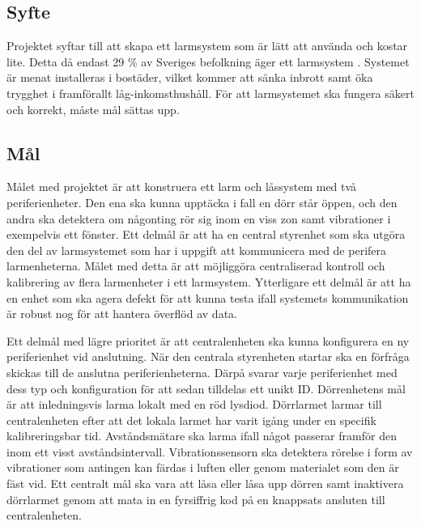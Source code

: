 \documentclass{article}
\begin{document}

\subsection{Syfte}
Projektet syftar till att skapa ett larmsystem som är lätt att använda och kostar lite.
Detta då endast 29 \% av Sveriges befolkning äger ett larmsystem \cite{SSF}.
Systemet är menat installeras i bostäder, vilket kommer att sänka inbrott samt öka trygghet i framförallt låg-inkomsthushåll.
För att larmsystemet ska fungera säkert och korrekt, måste mål sättas upp. 


\subsection{Mål}
Målet med projektet är att konstruera ett larm och låssystem med två periferienheter.
Den ena ska kunna upptäcka i fall en dörr står öppen, och den andra ska detektera om någonting rör sig inom en viss zon samt vibrationer i exempelvis ett fönster. 
Ett delmål är att ha en central styrenhet som ska utgöra den del av larmsystemet som har i uppgift att kommunicera med de perifera larmenheterna.
Målet med detta är att möjliggöra centraliserad kontroll och kalibrering av flera larmenheter i ett larmsystem.
Ytterligare ett delmål är att ha en enhet som ska agera defekt för att kunna testa ifall systemets kommunikation är robust nog för att hantera överflöd av data.

Ett delmål med lägre prioritet är att centralenheten ska kunna konfigurera en ny periferienhet vid anslutning. När den centrala styrenheten startar ska en förfråga skickas till de anslutna periferienheterna. 
Därpå svarar varje periferienhet med dess typ och konfiguration för att sedan tilldelas ett unikt ID. 
Dörrenhetens mål är att inledningsvis larma lokalt med en röd lysdiod. 
Dörrlarmet larmar till centralenheten efter att det lokala larmet har varit igång under en specifik kalibreringsbar tid.
Avståndsmätare ska larma ifall något passerar framför den inom ett visst avståndsintervall.
Vibrationssensorn ska detektera rörelse i form av vibrationer som antingen kan färdas i luften eller genom materialet som den är fäst vid. 
Ett centralt mål ska vara att låsa eller låsa upp dörren samt inaktivera dörrlarmet genom att mata in en fyrsiffrig kod på en knappsats ansluten till centralenheten.

\end{document}
